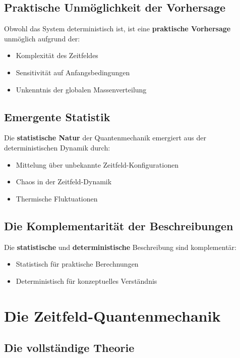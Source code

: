 \documentclass[12pt,a4paper]{report}
\begin{document}
	\subsection{Praktische Unmöglichkeit der Vorhersage}
	
	Obwohl das System deterministisch ist, ist eine \textbf{praktische Vorhersage} unmöglich aufgrund der:
	\begin{itemize}
		\item Komplexität des Zeitfeldes
		\item Sensitivität auf Anfangsbedingungen
		\item Unkenntnis der globalen Massenverteilung
	\end{itemize}
	
	\subsection{Emergente Statistik}
	
	Die \textbf{statistische Natur} der Quantenmechanik emergiert aus der deterministischen Dynamik durch:
	\begin{itemize}
		\item Mittelung über unbekannte Zeitfeld-Konfigurationen
		\item Chaos in der Zeitfeld-Dynamik
		\item Thermische Fluktuationen
	\end{itemize}
	
	\subsection{Die Komplementarität der Beschreibungen}
	
	Die \textbf{statistische} und \textbf{deterministische} Beschreibung sind komplementär:
	\begin{itemize}
		\item Statistisch für praktische Berechnungen
		\item Deterministisch für konzeptuelles Verständnis
	\end{itemize}
	
	\section{Die Zeitfeld-Quantenmechanik}
	
	\subsection{Die vollständige Theorie}
	
\end{document}

